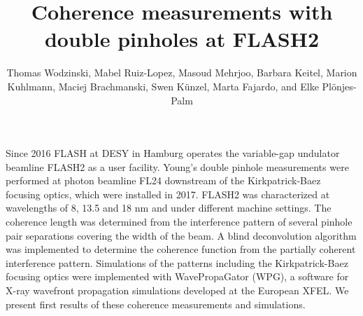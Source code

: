 \documentclass{osa-article}
\begin{document}
\title{Coherence measurements with double pinholes at FLASH2}

\author{Thomas Wodzinski, Mabel Ruiz-Lopez, Masoud Mehrjoo, Barbara Keitel, Marion Kuhlmann, Maciej Brachmanski, Swen K\"{u}nzel, Marta Fajardo, and Elke Pl\"{o}njes-Palm}

\address{GoLP/Instituto de Plasmas e Fus\~{a}o Nuclear, Instituto Superior T\'{e}cnico, 1049-001 Lisboa, Portugal\\
Deutsches Elektronen-Synchrotron DESY, Notkestrasse 85, 22607 Hamburg, Germany}




\begin{abstract*}

Since 2016 FLASH at DESY in Hamburg operates the variable-gap undulator 
beamline FLASH2 as a user facility. Young's double pinhole measurements were 
performed at photon beamline FL24 downstream of the Kirkpatrick-Baez 
focusing optics, which were installed in 2017. FLASH2 was characterized at 
wavelengths of 8, 13.5 and 18 nm and under different machine settings. The
coherence length was determined from the interference pattern of several 
pinhole pair separations
covering the width of the beam. A blind deconvolution algorithm was 
implemented to determine
the coherence function from the partially coherent interference pattern. 
Simulations of the
patterns including the Kirkpatrick-Baez focusing optics were implemented 
with WavePropaGator (WPG), a software for X-ray wavefront propagation 
simulations developed at the European XFEL. We present first results of 
these coherence measurements and simulations.
\end{abstract*}
\end{document}
